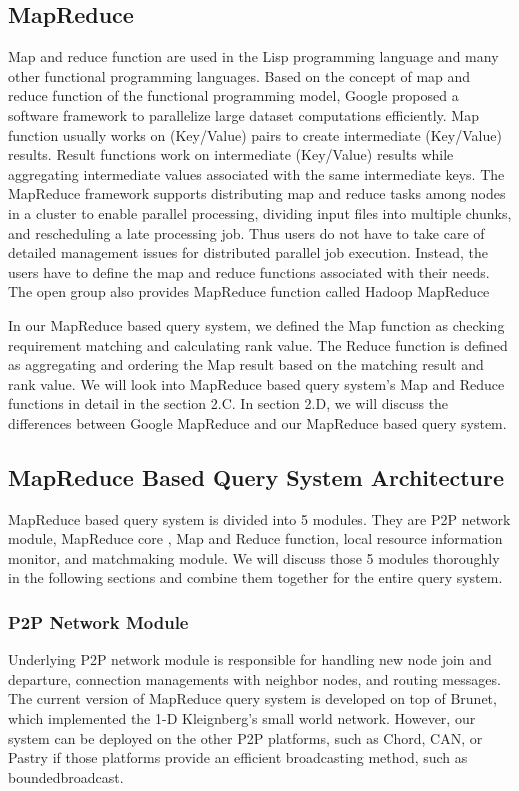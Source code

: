\documentclass{acm_proc_article-sp}
\begin{document}
\subsection{MapReduce}
Map and reduce function are used in the Lisp programming language and many other functional programming languages. 
Based on the concept of map and reduce function of the functional programming model, Google proposed a software framework to parallelize large dataset computations efficiently\cite{google_mapreduce}.
Map function usually works on (Key/Value) pairs to create intermediate (Key/Value) results. 
Result functions work on intermediate (Key/Value) results while aggregating intermediate values associated with the same intermediate keys.
The MapReduce framework supports distributing map and reduce tasks among nodes in a cluster to enable parallel processing, dividing input files into multiple chunks,
and rescheduling a late processing job. Thus users do not have to take care of detailed management issues for distributed parallel job execution. Instead, the users have to define the 
map and reduce functions associated with their needs.
The open group also provides MapReduce function called Hadoop MapReduce\cite{hadoop}

In our MapReduce based query system, we defined the Map function as checking requirement matching and calculating rank value. The Reduce function is defined as 
aggregating and ordering the Map result based on the matching result and rank value. We will look into MapReduce based query system's Map and Reduce functions in detail in the section 2.C. 
In section 2.D, we will discuss the differences between Google MapReduce and our MapReduce based query system.

\subsection{MapReduce Based Query System Architecture}
MapReduce based query system is divided into 5 modules. They are P2P network module, MapReduce core , Map and Reduce function, local resource information monitor, and matchmaking module.
We will discuss those 5 modules thoroughly in the following sections and combine them together for the entire query system.
\subsubsection{P2P Network Module}
Underlying P2P network module is responsible for handling new node join and departure, connection managements with neighbor nodes, and routing messages. 
The current version of MapReduce query system is developed on top of Brunet\cite{brunet}, which implemented the 1-D Kleignberg's small world network\cite{small_world_network}.
However, our system can be deployed on the other P2P platforms, such as Chord\cite{chord}, CAN\cite{can}, or Pastry\cite{pastry} if those platforms
provide an efficient broadcasting method, such as boundedbroadcast. 
\end{document}
